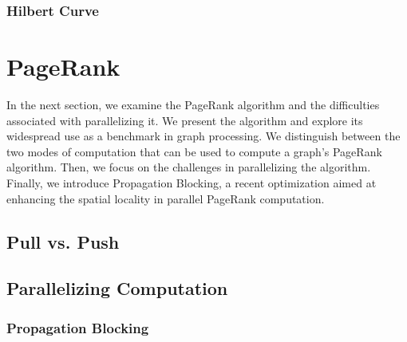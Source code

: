 \subsubsection{Hilbert Curve}

\section{PageRank}

In the next section, we examine the PageRank algorithm and the difficulties associated with parallelizing it. We present the algorithm and explore its widespread use as a benchmark in graph processing. We distinguish between the two modes of computation that can be used to compute a graph's PageRank algorithm. Then, we focus on the challenges in parallelizing the algorithm. Finally, we introduce Propagation Blocking, a recent optimization aimed at enhancing the spatial locality in parallel PageRank computation.
\subsection{Pull vs. Push}
\subsection{Parallelizing Computation}
\par{
}
\subsubsection{Propagation Blocking}
